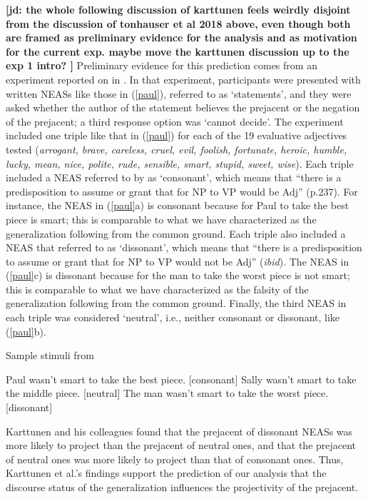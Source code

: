 \documentclass[11pt,fleqn]{article}
\newcommand{\6}{\mbox{$[\hspace*{-.6mm}[$}}
\newcommand{\9}{\mbox{$]\hspace*{-.6mm}]$}}
\newcommand{\jd}[1]{\textbf{\color{red}[jd: #1]}}
\begin{document}
\jd{the whole following discussion of karttunen feels weirdly disjoint from the discussion of tonhauser et al 2018 above, even though both are framed as preliminary evidence for the analysis and as motivation for the current exp. maybe move the karttunen discussion up to the exp 1 intro? } Preliminary evidence for this prediction comes from an experiment reported on in \citealt{karttunen-etal2014}. In that experiment, participants were presented with written NEASs like those in (\ref{paul}), referred to as `statements', and they were asked whether the author of the statement believes the prejacent or the negation of the prejacent; a third response option was `cannot decide'. The experiment included one triple like that in (\ref{paul}) for each of the 19 evaluative adjectives tested ({\em arrogant, brave, careless, cruel, evil,
foolish, fortunate, heroic, humble, lucky, mean, nice, polite, rude,
sensible, smart, stupid, sweet, wise}). Each triple included a NEAS referred to by \citet{karttunen-etal2014} as `consonant', which means that ``there is a predisposition to assume or grant that for NP to VP would be Adj'' (p.237). For instance, the NEAS in (\ref{paul}a) is consonant because for Paul to take the best piece is smart; this is comparable to what we have characterized as the generalization following from the common ground. Each triple also included a NEAS that \citet{karttunen-etal2014} referred to as `dissonant', which means that ``there is a predisposition to assume or grant that for NP to VP would not be Adj'' ({\em ibid}). The NEAS in (\ref{paul}c) is dissonant because for the man to take the worst piece is not smart; this is comparable to what we have characterized as the falsity of the generalization following from the common ground. Finally, the third NEAS in each triple was considered `neutral', i.e., neither consonant or dissonant, like (\ref{paul}b).

\begin{exe}
\ex\label{paul} Sample stimuli from \citealt[241]{karttunen-etal2014}
\begin{xlist}
\ex Paul wasn't smart to take the best piece. \hfill [consonant]
\ex Sally wasn't smart to take the middle piece.  \hfill [neutral]
\ex The man wasn't smart to take the worst piece. \hfill [dissonant]
\end{xlist}
\end{exe}

Karttunen and his colleagues found that the prejacent of dissonant NEASs was more likely to project than the prejacent of neutral ones, and that the prejacent of neutral ones was more likely to project than that of consonant ones. Thus, Karttunen et al.'s findings support the prediction of our analysis that the discourse status of the generalization influences the projectivity of the prejacent.
\end{document}
